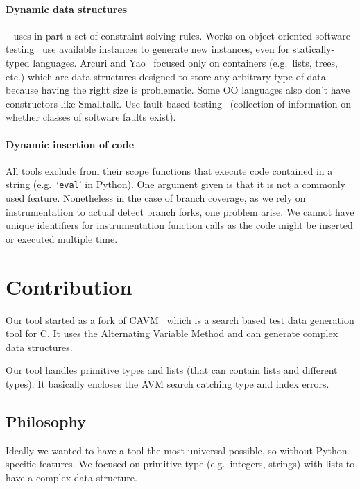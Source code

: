 \documentclass{llncs2e/llncs}
\begin{document}
\paragraph{Dynamic data structures}~\cite{lakhotia2008handling} uses in part a
set of constraint solving rules. Works on object-oriented software
testing~\cite{tonella2004evolutionary,ciupa2008artoo} use available instances to
generate new instances, even for statically-typed languages. Arcuri and
Yao~\cite{arcuri2008search} focused only on containers (e.g.\ lists, trees,
etc.) which are data structures designed to store any arbitrary type of data
because having the right size is problematic. Some OO languages also don't have
constructors like Smalltalk. Use fault-based testing~\cite{hayes1994testing}
(collection of information on whether classes of software faults exist).

\paragraph{Dynamic insertion of code} All tools exclude from their scope
functions that execute code contained in a string (e.g.\ `\texttt{eval}' in
Python). One argument given is that it is not a commonly used feature.
Nonetheless in the case of branch coverage, as we rely on instrumentation to
actual detect branch forks, one problem arise. We cannot have unique identifiers
for instrumentation function calls as the code might be inserted or executed
multiple time.


\section{Contribution}
\label{contribution}

Our tool started as a fork of CAVM~\cite{Kim2017ts} which is a search based test
data generation tool for C. It uses the Alternating Variable Method and can
generate complex data structures.

Our tool handles primitive types and lists (that can contain lists and different
types). It basically encloses the AVM search catching type and index errors.

\subsection{Philosophy}
\label{philosophy}

Ideally we wanted to have a tool the most universal possible, so without Python
specific features. We focused on primitive type (e.g.\ integers, strings) with
lists to have a complex data structure.
\end{document}
